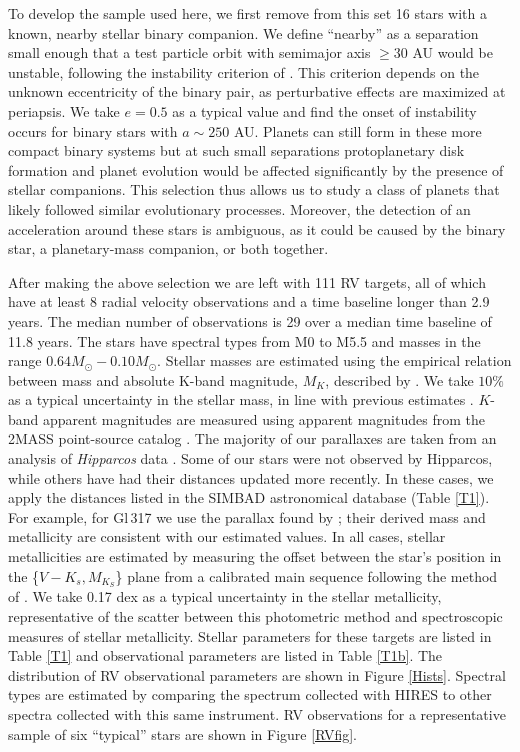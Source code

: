 To develop the sample used here, we first remove from this set 16 stars with a known, nearby stellar binary companion. We define ``nearby'' as a separation small enough that a test particle orbit with semimajor axis $\geq 30$ AU would be unstable, following the instability criterion of \citet{Holman99}. This criterion depends on the unknown eccentricity of the binary pair, as perturbative effects are maximized at periapsis. We take $e=0.5$ as a typical value and find the onset of instability occurs for binary stars with $a \sim 250$ AU. Planets can still form in these more compact binary systems \citep[e.g. Gl667C; ][]{Anglada-Escude12b} but at such small separations protoplanetary disk formation and planet evolution would be affected significantly by the presence of stellar companions. This selection thus allows us to study a class of planets that likely followed similar evolutionary processes. Moreover, the detection of an acceleration around these stars is ambiguous, as it could be caused by the binary star, a planetary-mass companion, or both together.

After making the above selection we are left with 111 RV targets, all of which have at least 8 radial velocity observations and a time baseline longer than 2.9 years. The median number of observations is 29 over a median time baseline of 11.8 years. The stars have spectral types from M0 to M5.5 and masses in the range $0.64M_\odot - 0.10M_\odot$. Stellar masses are estimated using the empirical relation between mass and absolute K-band magnitude, $M_K$, described by \citet{Delfosse00}. We take $10\%$ as a typical uncertainty in the stellar mass, in line with previous estimates \citep{Bean06}. $K$-band apparent magnitudes are measured using apparent magnitudes from the 2MASS point-source catalog \citep{Cutri03}. The majority of our parallaxes are taken from an analysis of \textit{Hipparcos} data \citep{vanLeeuwen07}. Some of our stars were not observed by Hipparcos, while others have had their distances updated more recently. In these cases, we apply the distances listed in the SIMBAD astronomical database (Table \ref{T1}). For example, for Gl\,317 we use the parallax found by \citet{Anglada-Escude12a}; their derived mass and metallicity are consistent with our estimated values. In all cases, stellar metallicities are estimated by measuring the offset between the star's position in the \{$V-K_s, M_{K_S}$\} plane from a calibrated main sequence following the method of \citet{Neves12}. We take 0.17 dex as a typical uncertainty in the stellar metallicity, representative of the scatter between this photometric method and spectroscopic measures of stellar metallicity. Stellar parameters for these targets are listed in Table \ref{T1} and observational parameters are listed in Table \ref{T1b}. The distribution of RV observational parameters are shown in Figure \ref{Hists}. Spectral types are estimated by comparing the spectrum collected with HIRES to other spectra collected with this same instrument. RV observations for a representative sample of six ``typical'' stars are shown in Figure \ref{RVfig}. 

